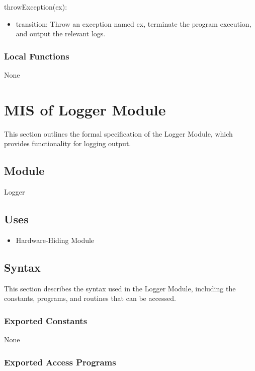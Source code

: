 \documentclass[12pt, titlepage]{article}
\begin{document}
\noindent throwException(ex):
\begin{itemize}
\item transition: Throw an exception named ex, terminate the program execution,
and output the relevant logs.
\end{itemize}

\subsubsection{Local Functions}

None

\newpage

\section{MIS of Logger Module} \label{MIS_Logger}

This section outlines the formal specification of the Logger Module, which
provides functionality for logging output.

\subsection{Module}

Logger

\subsection{Uses}

\begin{itemize}
\item Hardware-Hiding Module
\end{itemize}

\subsection{Syntax}

This section describes the syntax used in the Logger Module, including the
constants, programs, and routines that can be accessed.

\subsubsection{Exported Constants}

None

\subsubsection{Exported Access Programs}
\end{document}
